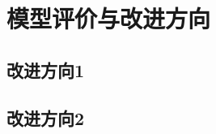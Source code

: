 \documentclass[withoutpreface,bwprint]{cumcmthesis}
\begin{document}
\section{模型评价与改进方向}

\subsection{改进方向1}

\subsection{改进方向2}



\nocite{*}


\newpage
\appendix
%
\end{document}
